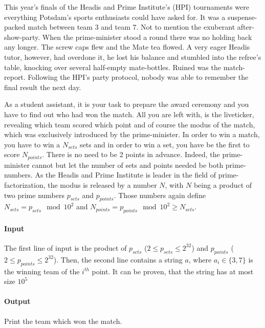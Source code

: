 



\makeheader

This year's finals of the Headis and Prime Institute's (HPI) tournaments were everything Potsdam's sports enthusiasts could have asked for.
It was a suspense-packed match between team 3 and team 7.
Not to mention the exuberant after-show-party.
When the prime-minister stood a round there was no holding back any longer.
The screw caps flew and the Mate tea flowed.
A very eager Headis tutor, however, had overdone it, he lost his balance and stumbled into the refree's table, knocking over several half-empty mate-bottles.
Ruined was the match-report.
Following the HPI's party protocol, nobody was able to remember the final result the next day.

As a student assistant, it is your task to prepare the award ceremony and you have to find out who had won the match.
All you are left with, is the liveticker, revealing which team scored which point and of course the modus of the match,
which was exclusively introduced by the prime-minister.
In order to win a match, you have to win a $N_{sets}$ sets and in order to win a set, you have be the first to score $N_{points}$.
There is no need to be 2 points in advance.
Indeed, the prime-minister cannot but let the number of sets and points needed be both prime-numbers.
As the Headis and Prime Institute is leader in the field of prime-factorization, the modus is released by a number $N$,
with $N$ being a product of two prime numbers $p_{sets}$ and $p_{points}$. Those numbers again define $N_{sets} =
p_{sets} \mod 10^{2}$ and $N_{points} = p_{points} \mod 10^{2} \geq N_{sets}$.

\paragraph*{Input}

The first line of input is the product of $p_{sets}$ ($2\leq p_{sets} \leq 2^{32}$) and $p_{points}$ ($2 \leq p_{points}
\leq 2^{32}$).
Then, the second line contains a string $a$, where $a_i \in \{3, 7\}$ is the winning team of the $i^{th}$ point.
It can be proven, that the string has at most size $10^{5}$

\paragraph*{Output}

Print the team which won the match.


\begin{samples}
\end{samples}


